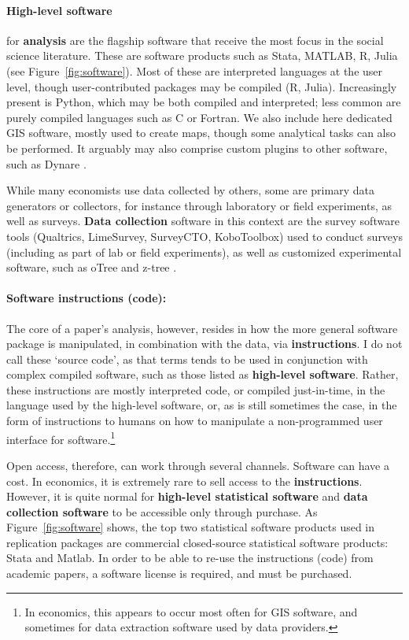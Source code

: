 \documentclass{article}
\begin{document}
\paragraph{High-level software} for \textbf{analysis} are the flagship software  that receive the most  focus in the social science literature. These are software products such as Stata, MATLAB, R, Julia (see Figure~\ref{fig:software}). Most of these are interpreted languages at the user level, though user-contributed packages may be compiled (R, Julia). Increasingly present is Python, which may be both compiled and interpreted; less common are purely compiled languages such as C or Fortran. We also include here dedicated \ac{GIS} software, mostly used to create maps, though some analytical tasks can also be performed. It arguably may also comprise custom plugins to other software, such as Dynare \citep{adjemian_dynare_2024,cherrier_write_2023}.



While many economists use data collected by others, some are primary data generators or collectors, for instance through laboratory or field experiments, as well as surveys. \textbf{Data collection} software in this context are the survey software tools (Qualtrics, LimeSurvey, SurveyCTO, KoboToolbox) used to conduct surveys (including as part of lab or field experiments), as well as customized experimental software, such as oTree \citep{chen_otreeopen-source_2016} and z-tree \citep{fischbacher_z-tree_2021}.

\paragraph{Software instructions (code):} The core of a paper's analysis, however, resides in how the more general software package is manipulated, in combination with the data, via \textbf{instructions}. I do not call these `source code', as that terms tends to be used in conjunction with complex compiled software, such as those listed as \textbf{high-level software}. Rather, these instructions are mostly interpreted code, or compiled just-in-time, in the language used by the high-level software, or, as is still sometimes the case, in the form of instructions to humans on how to manipulate a non-programmed user interface for software.\footnote{In economics, this appears to occur most often for \ac{GIS} software, and sometimes for data extraction software used by data providers.}

Open access, therefore, can work through several channels. Software can have a cost. In economics, it is extremely rare to sell access to the \textbf{instructions}. However, it is quite normal for \textbf{high-level statistical software} and \textbf{data collection software} to be accessible only through purchase. As Figure~\ref{fig:software} shows, the top two statistical software products used in replication packages are commercial closed-source statistical software products: Stata and Matlab. In order to be able to re-use the instructions (code) from academic papers, a software license is required, and must be purchased. 
\end{document}
